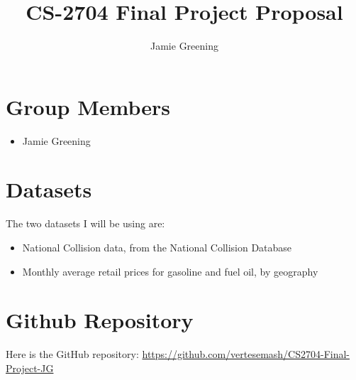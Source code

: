 \documentclass[runningheads]{llncs}
\begin{document}
%
\title{CS-2704 Final Project Proposal}
%
%
\author{Jamie Greening}
%
%
%
\maketitle              %
%

%
%
%
\section{Group Members}
\begin{itemize}
    \item Jamie Greening
\end{itemize}

\section{Datasets}
The two datasets I will be using are:
\begin{itemize}
    \item National Collision data, from the National Collision Database \cite{ref_url1}
    \item Monthly average retail prices for gasoline and fuel oil, by geography \cite{ref_url2}
\end{itemize}

\section{Github Repository}
Here is the GitHub repository: \url{https://github.com/vertesemash/CS2704-Final-Project-JG}
\end{document}
